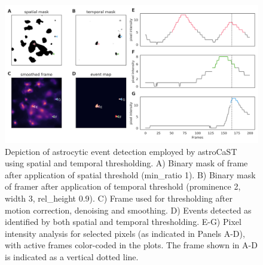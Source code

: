 \documentclass[utf8]{FrontiersinHarvard}
\begin{document}
    \begin{figure}[!htb]
        \begin{center}
            \includegraphics[width=\linewidth]{figures/5.png}
        \end{center}
        \caption{
            Depiction of astrocytic event detection employed by astroCaST using spatial and temporal thresholding. A) Binary mask of frame after application of spatial threshold (min\_ratio 1). B) Binary mask of framer after application of temporal threshold (prominence 2, width 3, rel\_height 0.9). C) Frame used for thresholding after motion correction, denoising and smoothing. D) Events detected as identified by both spatial and temporal thresholding. E-G) Pixel intensity analysis for selected pixels (as indicated in Panels A-D), with active frames color-coded in the plots. The frame shown in A-D is indicated as a vertical dotted line.
        }\label{fig:5}
    \end{figure}
\end{document}
